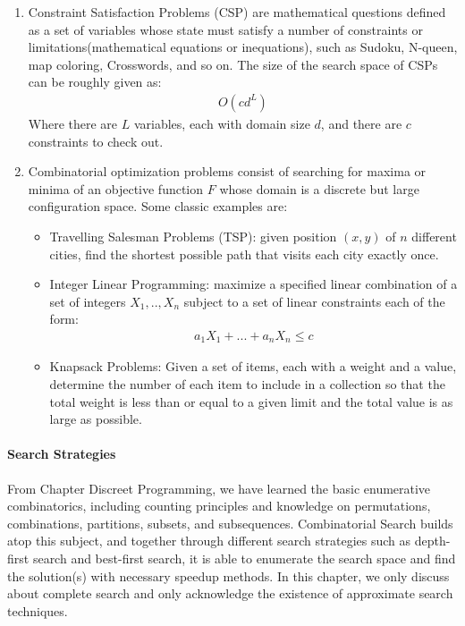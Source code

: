 \documentclass[../main.tex]{subfiles}
\begin{document}
\begin{enumerate}
    \item Constraint Satisfaction Problems (CSP) are mathematical questions defined as a set of variables whose state must satisfy a number of constraints or limitations(mathematical equations or inequations), such as Sudoku, N-queen, map coloring, Crosswords, and so on. The size of the search space of CSPs can be roughly given as:
    \begin{align}
        O(cd^L)
    \end{align}
    Where there are $L$ variables, each with domain size $d$, and there are $c$ constraints to check out. 
    \item Combinatorial optimization problems consist of searching for maxima or minima of an objective function $F$ whose domain is a discrete but large configuration space.  Some classic examples are:
    \begin{itemize}
        \item Travelling Salesman Problems (TSP): given position $(x, y)$ of $n$ different cities, find the shortest possible path that visits each city exactly once.
        \item Integer Linear Programming: maximize a specified linear combination of a set of integers $X_1, .., X_{n}$ subject to a set of linear constraints each of the form:
        \begin{align}
            a_1X_1 + ... + a_{n}X_{n} \leq c
        \end{align}
        \item Knapsack Problems: Given a set of items, each with a weight and a value, determine the number of each item to include in a collection so that the total weight is less than or equal to a given limit and the total value is as large as possible.
    \end{itemize}
\end{enumerate}


\paragraph{Search Strategies} From Chapter Discreet Programming, we have learned the basic enumerative combinatorics, including counting principles and knowledge on permutations, combinations, partitions, subsets, and subsequences. Combinatorial Search builds atop this subject, and together through different search strategies such as depth-first search and best-first search, it is able to enumerate the search space and find the solution(s)  with necessary speedup methods. In this chapter, we only discuss about complete search and only acknowledge the existence of approximate search techniques. 
\end{document}
